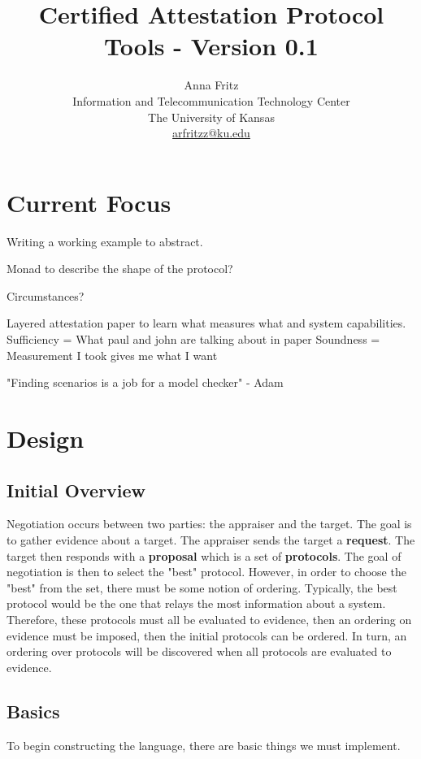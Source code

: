 \documentclass[10pt]{report}
\title{Certified Attestation Protocol Tools - Version 0.1}
\author{
  Anna Fritz \\
  Information and Telecommunication Technology Center \\
  The University of Kansas \\
  \url{arfritzz@ku.edu}
}
\begin{document}
\maketitle
\tableofcontents

\chapter{Current Focus}

Writing a working example to abstract.

Monad to describe the shape of the protocol? 

Circumstances?

Layered attestation paper to learn what measures what and system 
capabilities. 
Sufficiency =  What paul and john are talking about in paper
Soundness = Measurement  I took gives me what I want

"Finding scenarios is a job for a model checker" - Adam

\chapter{Design}

\section{Initial Overview}

Negotiation occurs between two parties: the appraiser and the target.
The goal is to gather evidence about a target. The appraiser sends the
target a \textbf{request}. The target then responds
with a \textbf{proposal} which is a set of \textbf{protocols}. The goal of
negotiation is then to select the "best" protocol. However, in order to
choose the "best" from the set, there must be some notion of ordering.
Typically, the best protocol would be the one that relays the most 
information about a system. Therefore, these protocols must all be evaluated
to evidence, then an ordering on evidence must be imposed, then the initial protocols can be ordered. 
In turn, an ordering over protocols will be discovered when all 
protocols are evaluated to evidence.  

\section{Basics}

To begin constructing the language, there are basic things we must implement. 
\end{document}
